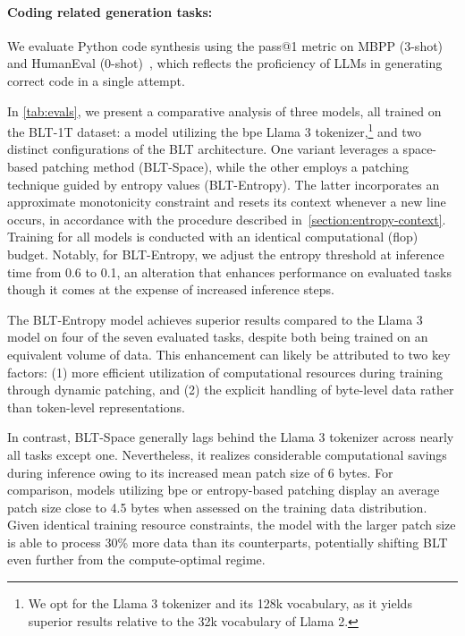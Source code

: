 \paragraph{Coding related generation tasks:}  We evaluate Python code synthesis using the pass@1 metric on MBPP (3-shot)~\citep{Eval_MBPP} and HumanEval (0-shot)~\citep{Eval_HumanEval}, which reflects the proficiency of LLMs in generating correct code in a single attempt.

In \autoref{tab:evals}, we present a comparative analysis of three models, all trained on the {\textsc BLT}-1T dataset: a model utilizing the bpe Llama 3 tokenizer,\footnote{We opt for the Llama 3 tokenizer and its 128k vocabulary, as it yields superior results relative to the 32k vocabulary of Llama 2.} and two distinct configurations of the {\textsc BLT} architecture. One variant leverages a space-based patching method ({\textsc BLT}-Space), while the other employs a patching technique guided by entropy values ({\textsc BLT}-Entropy). The latter incorporates an approximate monotonicity constraint and resets its context whenever a new line occurs, in accordance with the procedure described in~\autoref{section:entropy-context}. Training for all models is conducted with an identical computational (flop) budget. Notably, for {\textsc BLT}-Entropy, we adjust the entropy threshold at inference time from 0.6 to 0.1, an alteration that enhances performance on evaluated tasks though it comes at the expense of increased inference steps.

The {\textsc BLT}-Entropy model achieves superior results compared to the Llama 3 model on four of the seven evaluated tasks, despite both being trained on an equivalent volume of data. This enhancement can likely be attributed to two key factors: (1) more efficient utilization of computational resources during training through dynamic patching, and (2) the explicit handling of byte-level data rather than token-level representations.

In contrast, {\textsc BLT}-Space generally lags behind the Llama 3 tokenizer across nearly all tasks except one. Nevertheless, it realizes considerable computational savings during inference owing to its increased mean patch size of 6 bytes. For comparison, models utilizing bpe or entropy-based patching display an average patch size close to 4.5 bytes when assessed on the training data distribution. Given identical training resource constraints, the model with the larger patch size is able to process 30\% more data than its counterparts, potentially shifting {\textsc BLT} even further from the compute-optimal regime.


